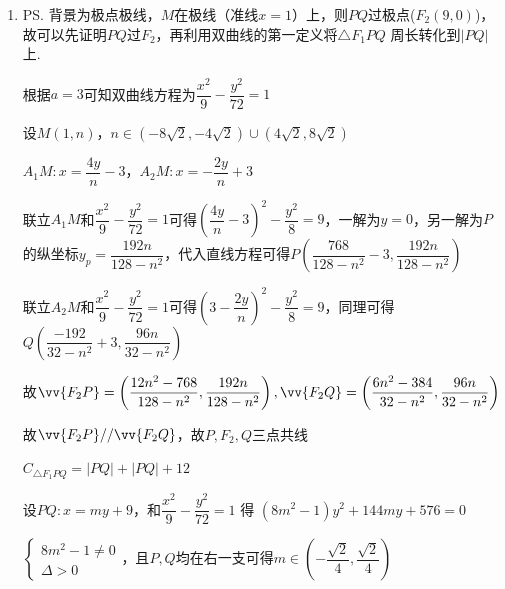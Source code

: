 \begin{enumerate}
\begin{jieda}
\begin{enumerate}
            设$A(x_0, y_0), B(-x_0, -y_0), P(x_p, y_p)$，故$k_1 = \dfrac{y_p - y_0}{x_p - x_0}, k_2 = \dfrac{y_p + y_0}{x_p + x_0}$，$k_1k_2 = \dfrac{y_p^2-y_0^2}{x_p^2-x_0^2}$

            $\dfrac{x^2}{a^2} - \dfrac{y^2}{8a^2} = 1$即$x^2 = a^2 + \dfrac{y^2}{8}$

            $k_1k_2 = \dfrac{y_p^2-y_0^2}{x_p^2-x_0^2} = \dfrac{y_p^2-y_0^2}{\left(a^2+\dfrac{y_p^2}{8}\right) - \left(a^2+\dfrac{y_0^2}{8}\right)} = 8$

            \item \ps 背景为极点极线，$M$在极线（准线$x = 1$）上，则$PQ$过极点($F_2(9, 0)$)，故可以先证明$PQ$过$F_2$，再利用双曲线的第一定义将$\bigtriangleup {F}_{1}{PQ}$ 周长转化到$|PQ|$上.

            根据$a = 3$可知双曲线方程为$\dfrac{x^2}{9} - \dfrac{y^2}{72} = 1$

            设$M(1, n)$，$n \in (-8\sqrt{2}, -4\sqrt{2}) \cup (4\sqrt{2}, 8\sqrt{2})$

            $A_1M: x = \dfrac{4y}{n} - 3$，$A_2M: x = -\dfrac{2y}{n}+3$

            联立$A_1M$和$\dfrac{x^2}{9} - \dfrac{y^2}{72} = 1$可得$\left(\dfrac{4y}{n}-3\right)^2 - \dfrac{y^2}{8} = 9$，一解为$y = 0$，另一解为$P$的纵坐标$y_p = \dfrac{192n}{128-n^2}$，代入直线方程可得$P\left(\dfrac{768}{128-n^2}-3, \dfrac{192n}{128-n^2}\right)$

            联立$A_2M$和$\dfrac{x^2}{9} - \dfrac{y^2}{72} = 1$可得$\left(3-\dfrac{2y}{n}\right)^2 - \dfrac{y^2}{8} = 9$，同理可得$Q\left(\dfrac{-192}{32-n^2}+3, \dfrac{96n}{32-n^2}\right)$

            故$\vv{F_2P} = \left(\dfrac{12n^2-768}{128-n^2}, \dfrac{192n}{128-n^2}\right), \vv{F_2Q} = \left(\dfrac{6n^2-384}{32-n^2}, \dfrac{96n}{32-n^2}\right)$

            故$\vv{F_2P} // \vv{F_2Q}$，故$P,F_2,Q$三点共线

            $C_{\bigtriangleup {F}_{1}{PQ}} = |PQ| + |PQ| + 12$

            设$PQ: x = my + 9$，和$\dfrac{x^2}{9} - \dfrac{y^2}{72} = 1$ 得 $\left( {8{m}^{2} - 1}\right) {y}^{2} + {144my} + 576 = 0$
            
            $\left\{  \begin{array}{l} 8{m}^{2} - 1 \neq  0 \\  \Delta  > 0 \end{array}\right.$，且$P,Q$均在右一支可得$m \in \left(-\dfrac{\sqrt{2}}{4}, \dfrac{\sqrt{2}}{4}\right)$
            

\end{enumerate}
\end{jieda}
\end{enumerate}
